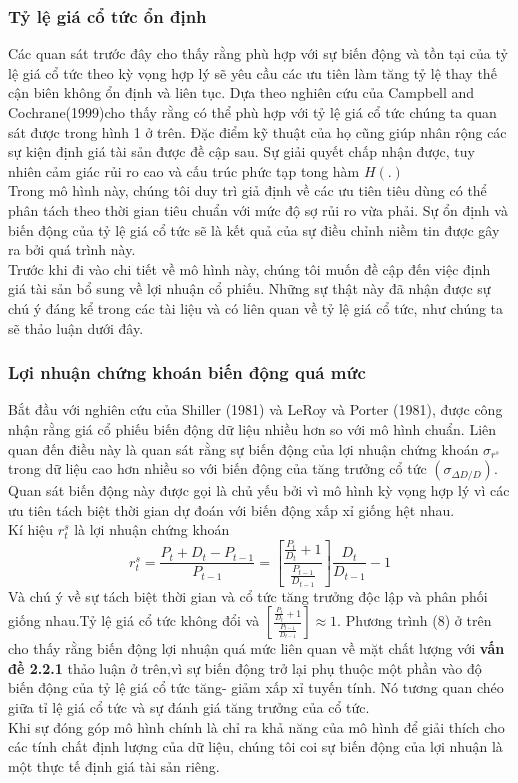 \documentclass[10pt,a4paper]{article}
\begin{document}
	\subsubsection{Tỷ lệ giá cổ tức ổn định}
	
	Các quan sát trước đây cho thấy rằng phù hợp với sự biến động và tồn tại của tỷ lệ giá cổ tức theo kỳ vọng hợp lý sẽ yêu cầu các ưu tiên làm tăng tỷ lệ thay thế cận biên không ổn định và liên tục. Dựa theo nghiên cứu của Campbell and Cochrane(1999)cho thấy rằng có thể phù hợp với tỷ lệ giá cổ tức chúng ta quan sát được trong hình 1 ở trên.
	Đặc điểm kỹ thuật của họ cũng giúp nhân rộng các sự kiện định giá tài sản được đề cập sau. Sự giải quyết chấp nhận được, tuy nhiên cảm giác rủi ro cao và cấu trúc phức tạp tong hàm $H(.)$\\
	Trong mô hình này, chúng tôi duy trì giả định về các ưu tiên tiêu dùng có thể phân tách theo thời gian tiêu chuẩn với mức độ sợ rủi ro vừa phải.
	Sự ổn định và biến động của tỷ lệ giá cổ tức sẽ là kết quả của sự điều chỉnh niềm tin được gây ra bởi quá trình này.\\
	Trước khi đi vào chi tiết về mô hình này, chúng tôi muốn đề cập đến việc định giá tài sản bổ sung về lợi nhuận cổ phiếu. Những sự thật này đã nhận được sự chú ý đáng kể trong các tài liệu và có liên quan về tỷ lệ giá cổ tức, như chúng ta sẽ thảo luận dưới đây.
	\subsubsection{Lợi nhuận chứng khoán biến động quá mức}
	Bắt đầu với nghiên cứu  của Shiller (1981) và LeRoy và Porter (1981),
	được công nhận rằng giá cổ phiếu biến động dữ liệu nhiều hơn so với mô hình chuẩn.
	Liên quan đến điều này là quan sát rằng sự biến động của lợi nhuận chứng khoán
	$\sigma_{r^s}$ trong dữ liệu cao hơn nhiều so với biến động của tăng trưởng cổ tức $(\sigma_{\Delta D/D}).$
	Quan sát biến động này  được gọi là  chủ yếu bởi vì mô hình kỳ vọng hợp lý vì các ưu tiên tách 
	biệt thời gian dự đoán với biến động xấp xỉ giống hệt nhau.\\
	Kí hiệu $r^s_t$ là lợi nhuận chứng khoán
	\begin{equation}
	r^s_t=\frac{P_t+D_t-P_{t-1}}{P_{t-1}}=\left[\frac{\frac{P_t}{D_t}+1}{\frac{P_{t-1}}{D_{t-1}}}\right]\frac{D_t}{D_{t-1}}-1
	\end{equation}
	Và chú ý về sự tách biệt thời gian và cổ tức tăng trưởng độc lập và phân phối giống nhau.Tỷ lệ giá cổ tức không đổi và  $\left[\frac{\frac{P_t}{D_t}+1}{\frac{P_{t-1}}{D_{t-1}}}\right]\approx 1.$
	Phương trình (8) ở trên cho thấy rằng  biến động lợi nhuận quá mức liên quan về mặt chất lượng với \textbf{vấn đề 2.2.1} thảo luận ở trên,vì sự biến động trở lại phụ thuộc một phần vào độ biến động của tỷ lệ giá cổ tức tăng- giảm xấp xỉ tuyến tính. Nó tương quan chéo giữa tỉ lệ giá cổ tức và sự đánh giá tăng trưởng của cổ tức. \\
	Khi sự đóng góp mô hình chính là chỉ ra khả năng của mô hình để giải thích cho các tính chất định lượng của dữ liệu, chúng tôi coi sự biến động của lợi nhuận là một thực tế định giá tài sản riêng.
\end{document}
